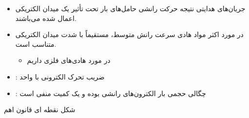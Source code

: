 \begin{ELunit}

\begin{itemize}
\tightlist
\item
  جریان‌های هدایتی نتیجه حرکت رانشی حامل‌های بار تحت تأثیر یک میدان الکتریکی اعمال شده می‌باشند.
\item
  در مورد اکثر مواد هادی سرعت رانش متوسط، مستقیماً با شدت میدان الکتریکی متناسب است.

  \begin{itemize}
  \tightlist
  \item
    در مورد هادی‌های فلزی داریم
  \end{itemize}
\end{itemize}


\begin{itemize}
\tightlist
\item
  : ضریب تحرک الکترونی با واحد 
\end{itemize}


\end{ELunit}

\begin{ELjoin}

\begin{itemize}
\tightlist
\item
  : چگالی حجمی بار الکترون‌های رانشی بوده و یک کمیت منفی است
\end{itemize}

\begin{ELimportant}{شکل نقطه ای قانون اهم}


\end{ELimportant}

\end{ELjoin}

